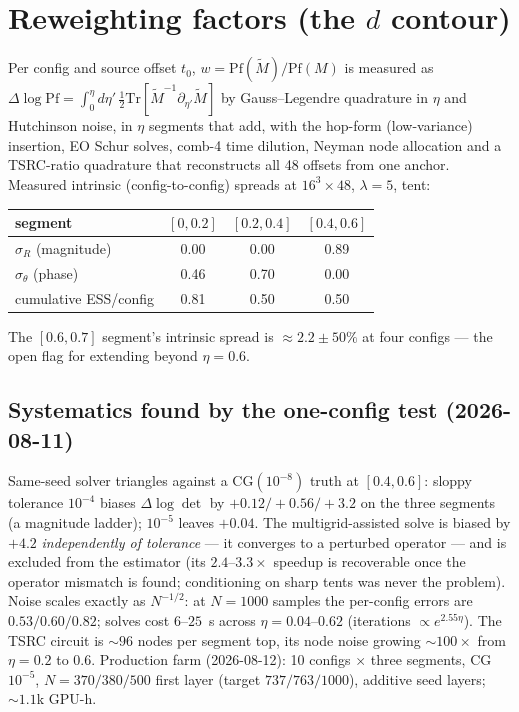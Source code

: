 \documentclass[11pt]{article}
\begin{document}
\section{Reweighting factors (the $d$ contour)}
Per config and source offset $t_0$, $w=\mathrm{Pf}(\tilde M)/\mathrm{Pf}(M)$ is measured as
$\Delta\log\mathrm{Pf}=\int_0^\eta d\eta'\,\tfrac12\mathrm{Tr}[\tilde M^{-1}\partial_{\eta'}\tilde M]$
by Gauss--Legendre quadrature in $\eta$ and Hutchinson noise, in $\eta$ segments that add,
with the hop-form (low-variance) insertion, EO Schur solves, comb-4 time dilution, Neyman node
allocation and a TSRC-ratio quadrature that reconstructs all 48 offsets from one anchor.
Measured intrinsic (config-to-config) spreads at $16^3\times48$, $\lambda=5$, tent:
\begin{center}
\begin{tabular}{lccc}
\toprule
segment & $[0,0.2]$ & $[0.2,0.4]$ & $[0.4,0.6]$\\
\midrule
$\sigma_R$ (magnitude) & 0.00 & 0.00 & 0.89\\
$\sigma_\theta$ (phase) & 0.46 & 0.70 & 0.00\\
cumulative ESS/config & 0.81 & 0.50 & 0.50\\
\bottomrule
\end{tabular}
\end{center}
The $[0.6,0.7]$ segment's intrinsic spread is $\approx2.2\pm50\%$ at four configs --- the
open flag for extending beyond $\eta=0.6$.

\subsection{Systematics found by the one-config test (2026-08-11)}
Same-seed solver triangles against a CG$(10^{-8})$ truth at $[0.4,0.6]$:
sloppy tolerance $10^{-4}$ biases $\Delta\log\det$ by $+0.12/+0.56/+3.2$ on the three segments
(a magnitude ladder); $10^{-5}$ leaves $+0.04$.  The multigrid-assisted solve is biased by
$+4.2$ \emph{independently of tolerance} --- it converges to a perturbed operator --- and is
excluded from the estimator (its $2.4$--$3.3\times$ speedup is recoverable once the operator
mismatch is found; conditioning on sharp tents was never the problem).  Noise scales exactly as
$N^{-1/2}$: at $N=1000$ samples the per-config errors are $0.53/0.60/0.82$; solves cost
$6$--$25$~s across $\eta=0.04$--$0.62$ (iterations $\propto e^{2.55\eta}$).  The TSRC circuit is
$\sim96$ nodes per segment top, its node noise growing $\sim100\times$ from $\eta=0.2$ to
$0.6$.  Production farm (2026-08-12): 10 configs $\times$ three segments, CG $10^{-5}$,
$N=370/380/500$ first layer (target $737/763/1000$), additive seed layers; $\sim1.1$k GPU-h.
\end{document}
